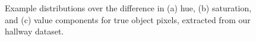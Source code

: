 \begin{figure}[t]
  \hspace{0.05cm}
  \caption[Example distributions over the difference in hue,
    saturation, and value components for true object pixels, extracted
    from our hallway dataset.]{\small Example distributions over the
    difference in (a) hue, (b) saturation, and (c) value components
    for true object pixels, extracted from our hallway dataset.}
  \label{fig:foreground-distribution}
\end{figure}

